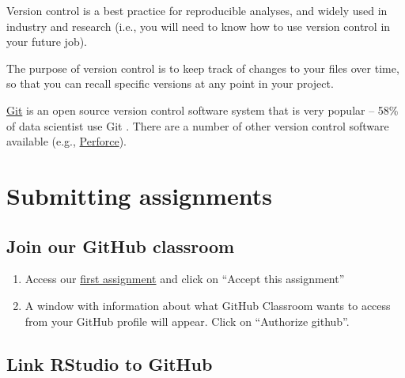 \documentclass[
]{book}
\begin{document}
Version control is a best practice for reproducible analyses, and widely used in industry and research (i.e., you will need to know how to use version control in your future job).

The purpose of version control is to keep track of changes to your files over time, so that you can recall specific versions at any point in your project.

\href{https://git-scm.com/}{Git} is an open source version control software system that is very popular -- 58\% of data scientist use Git \citep{beckman2020implementing}. There are a number of other version control software available (e.g., \href{https://www.perforce.com/blog/vcs/git-vs-perforce-how-choose-and-when-use-both}{Perforce}).

\hypertarget{submitting-assignments}{%
\section{Submitting assignments}\label{submitting-assignments}}

\hypertarget{join-our-github-classroom}{%
\subsection{Join our GitHub classroom}\label{join-our-github-classroom}}

\begin{enumerate}
\def\labelenumi{\arabic{enumi}.}
\item
  Access our \href{https://classroom.github.com/a/zjVO8fZw}{first assignment} and click on ``Accept this assignment''
\item
  A window with information about what GitHub Classroom wants to access from your GitHub profile will appear. Click on ``Authorize github''.
\end{enumerate}

\hypertarget{link-rstudio-to-github}{%
\subsection{Link RStudio to GitHub}\label{link-rstudio-to-github}}
\end{document}

